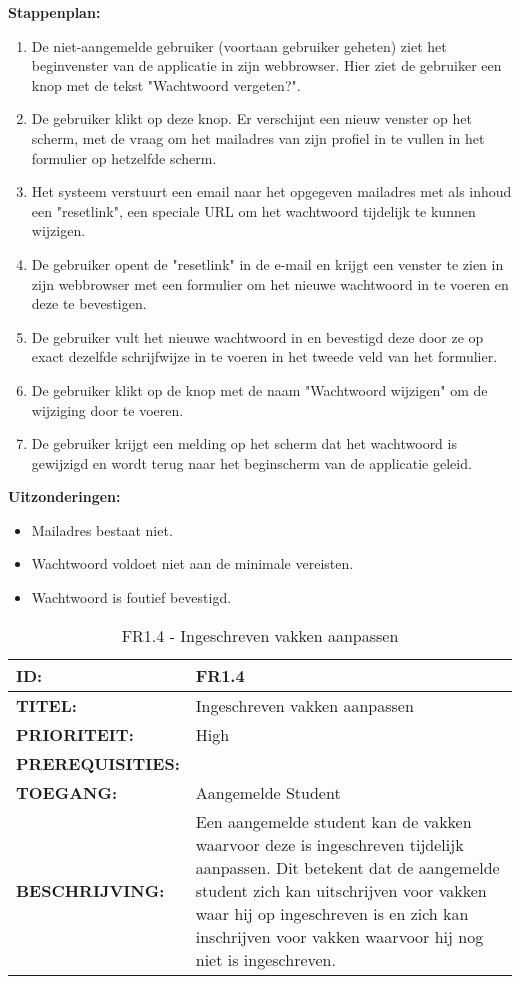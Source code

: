 \textbf{Stappenplan:}
\begin{enumerate}
\item De niet-aangemelde gebruiker (voortaan gebruiker geheten) ziet het beginvenster van de applicatie in zijn webbrowser. Hier ziet de gebruiker een knop met de tekst "Wachtwoord vergeten?".
\item De gebruiker klikt op deze knop. Er verschijnt een nieuw venster op het scherm, met de vraag om het mailadres van zijn profiel in te vullen in het formulier op hetzelfde scherm.
\item Het systeem verstuurt een email naar het opgegeven mailadres met als inhoud een "resetlink", een speciale URL om het wachtwoord tijdelijk te kunnen wijzigen.
\item De gebruiker opent de "resetlink" in de e-mail en krijgt een venster te zien in zijn webbrowser met een formulier om het nieuwe wachtwoord in te voeren en deze te bevestigen.
\item De gebruiker vult het nieuwe wachtwoord in en bevestigd deze door ze op exact dezelfde schrijfwijze in te voeren in het tweede veld van het formulier.
\item De gebruiker klikt op de knop met de naam "Wachtwoord wijzigen" om de wijziging door te voeren.
\item De gebruiker krijgt een melding op het scherm dat het wachtwoord is gewijzigd en wordt terug naar het beginscherm van de applicatie geleid.
\end{enumerate}

\textbf{Uitzonderingen:}
\begin{itemize}
\item Mailadres bestaat niet.
\item Wachtwoord voldoet niet aan de minimale vereisten.
\item Wachtwoord is foutief bevestigd.
\end{itemize}

\noindent\begin{table}[H]
            \begin{tabular}{l | p{10cm}}
                \textbf{ID:} & FR1.4\\ \hline
                \textbf{TITEL:} & Ingeschreven vakken aanpassen\\ \hline
                \textbf{PRIORITEIT:} &  High \\ \hline
                \textbf{PREREQUISITIES:} & \\ \hline
                \textbf{TOEGANG:} &  Aangemelde Student \\ \hline
                \textbf{BESCHRIJVING:} & Een aangemelde student kan de vakken waarvoor deze is ingeschreven tijdelijk aanpassen. 
                						Dit betekent dat de aangemelde student zich kan uitschrijven voor vakken waar hij op ingeschreven is en  zich kan inschrijven voor vakken waarvoor hij nog niet is ingeschreven.\\
            \end{tabular}\\
            \caption{FR1.4 - Ingeschreven vakken aanpassen}
            \label{tab:FR1.4 - Ingeschreven vakken aanpassen}
        \end{table}
        
